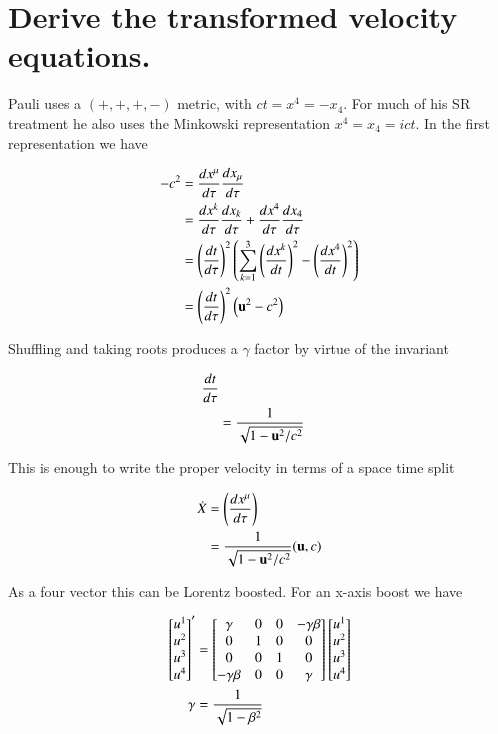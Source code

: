 \section{Derive the transformed velocity equations. }

Pauli uses a $(+,+,+,-)$ metric, with $ct = x^4 = - x_4$.  For much of his SR treatment he also uses the Minkowski representation $x^4 = x_4 = ict$. In the first representation we have

\begin{align*}
-c^2 
&= \frac{dx^\mu}{d\tau} \frac{dx_\mu}{d\tau} \\
&= \frac{dx^k}{d\tau} \frac{dx_k}{d\tau} + \frac{dx^4}{d\tau} \frac{dx_4}{d\tau} \\
&= \left(\frac{dt}{d\tau}\right)^2 \left( \sum_{k=1}^3 \left(\frac{dx^k}{dt}\right)^2 - \left(\frac{dx^4}{dt}\right)^2 \right) \\
&= \left(\frac{dt}{d\tau}\right)^2 \left( \mathbf{u}^2 - c^2 \right) \\
\end{align*}

Shuffling and taking roots produces a $\gamma$ factor by virtue of the invariant

\begin{align*}
\frac{dt}{d\tau} \\
&= \frac{1}{\sqrt{ 1 - \mathbf{u}^2/c^2 }}
\end{align*}

This is enough to write the proper velocity in terms of a space time split 

\begin{align*}
\dot{X} 
&= \left(\frac{dx^\mu}{d\tau}\right) \\
&= \frac{1}{\sqrt{ 1 - \mathbf{u}^2/c^2 }} (\mathbf{u}, c)
\end{align*}

As a four vector this can be Lorentz boosted.  For an 
x-axis boost we have

\begin{align*}
{\begin{bmatrix}
u^1 \\
u^2 \\
u^3 \\
u^4 \\
\end{bmatrix}}'
&=
\begin{bmatrix}
\gamma & 0 & 0 & - \gamma \beta \\
0 & 1 & 0 & 0 \\
0 & 0 & 1 & 0 \\
- \gamma \beta & 0 & 0 & \gamma \\
\end{bmatrix}
{\begin{bmatrix}
u^1 \\
u^2 \\
u^3 \\
u^4 \\
\end{bmatrix}} 
\\
\gamma &= \frac{1}{\sqrt{ 1 - \beta^2 }} \\
\end{align*}

